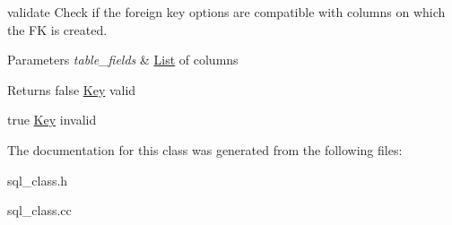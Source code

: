 validate Check if the foreign key options are compatible with columns on which the FK is created. 


\begin{DoxyParams}{Parameters}
{\em table\+\_\+fields} & \mbox{\hyperlink{classList}{List}} of columns\\
\hline
\end{DoxyParams}
\begin{DoxyReturn}{Returns}
false \mbox{\hyperlink{classKey}{Key}} valid 

true \mbox{\hyperlink{classKey}{Key}} invalid 
\end{DoxyReturn}


The documentation for this class was generated from the following files\+:\begin{DoxyCompactItemize}
\item 
sql\+\_\+class.\+h\item 
sql\+\_\+class.\+cc\end{DoxyCompactItemize}

